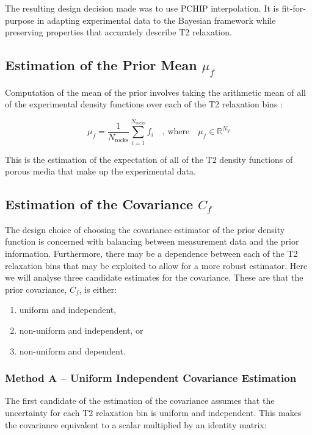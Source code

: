 The resulting design decision made was to use PCHIP interpolation. It is fit-for-purpose in adapting experimental data to the Bayesian framework while preserving properties that accurately describe T2 relaxation.

\subsection{Estimation of the Prior Mean $\mu_f$}
\label{section:estPriorMean}
Computation of the mean of the prior involves taking the arithmetic mean of all of the experimental density functions over each of the T2 relaxation bins \cite{DiscreteRandomSignalsBookCovarianceEst}:

\begin{equation}
    \label{eq:mean_estimation_prior}
    \mu_f = \frac{1}{N_\text{rocks}} \sum^{N_\text{rocks}}_{i=1} f_i \quad \text{, where} \quad \mu_f \in \mathbb{R}^{N_{y}}
\end{equation}

 This is the estimation of the expectation of all of the T2 density functions of porous media that make up the experimental data.

\subsection{Estimation of the Covariance $C_f$}
The design choice of choosing the covariance estimator of the prior density function is concerned with balancing between measurement data and the prior information. Furthermore, there may be a dependence between each of the T2 relaxation bins that may be exploited to allow for a more robust estimator. 
Here we will analyse three candidate estimates for the covariance. These are that the prior covariance, $C_f$, is either:
\begin{enumerate}
    \item uniform and independent,
    \item non-uniform and independent, or
    \item non-uniform and dependent.
\end{enumerate}


\subsubsection{Method A -- Uniform Independent Covariance Estimation}\label{section:uniformIndependentCovar}
The first candidate of the estimation of the covariance assumes that the uncertainty for each T2 relaxation bin is uniform and independent. This makes the covariance equivalent to a scalar multiplied by an identity matrix:

